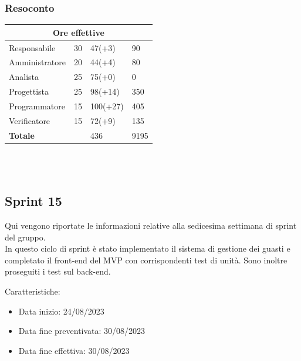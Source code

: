 \documentclass[9pt]{article}
\begin{document}
\subsubsection{Resoconto}
\begin{center}
	\begin{tabularx}{\textwidth}{|X|X|X|X|}
		\hline														
		\multicolumn{4}{|c|}{\textbf{Ore effettive}}                                      \\														
		\hline														
		Responsabile		&		30		&		47(+3)		&		90		\\
		\hline														
		Amministratore		&		20		&		44(+4)		&		80		\\
		\hline														
		Analista		&		25		&		75(+0)		&		0		\\
		\hline														
		Progettista		&		25		&		98(+14)		&		350		\\
		\hline														
		Programmatore		&		15		&		100(+27)		&		405		\\
		\hline														
		Verificatore		&		15		&		72(+9)		&		135		\\
		\hline														
		\hline														
		\textbf{Totale}		&				&		436		&		9195		\\
		\hline																																							
	\end{tabularx}\\[8pt]
	\mbox{}\\
\end{center}

\subsection{Sprint 15}
Qui vengono riportate le informazioni relative alla sedicesima settimana di sprint del gruppo. \\
In questo ciclo di sprint è stato implementato il sistema di gestione dei guasti e completato il front-end del MVP con corrispondenti test di unità.
Sono inoltre proseguiti i test sul back-end.

Caratteristiche:

\begin{itemize}
	\item Data inizio: 24/08/2023
	\item Data fine preventivata: 30/08/2023
	\item Data fine effettiva: 30/08/2023
\end{itemize}
\end{document}

